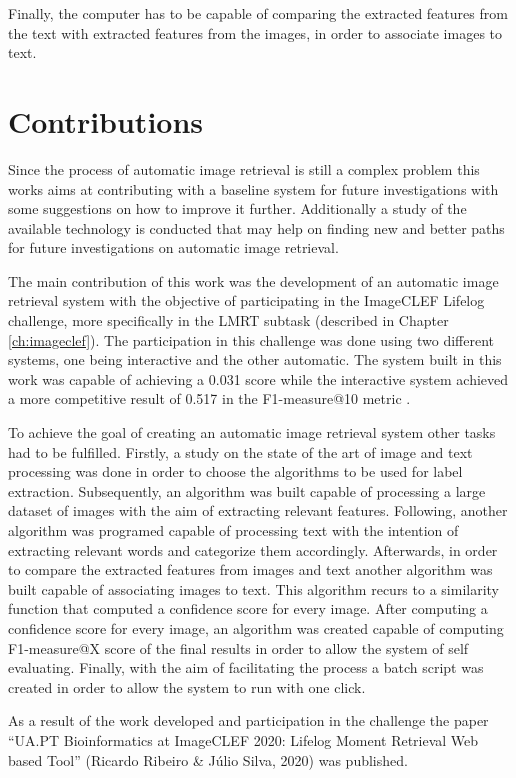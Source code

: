 Finally, the computer has to be capable of comparing the extracted features from the text with extracted features from the images, in order to associate images to text.

\section{Contributions}

Since the process of automatic image retrieval is still a complex problem this works aims at contributing with a baseline system for future investigations with some suggestions on how to improve it further. Additionally a study of the available technology is conducted that may help on finding new and better paths for future investigations on automatic image retrieval.

The main contribution of this work was the development of an automatic image retrieval system with the objective of participating in the ImageCLEF Lifelog challenge, more specifically in the LMRT subtask (described in Chapter \ref{ch:imageclef}). The participation in this challenge was done using two different systems, one being interactive and the other automatic. The system built in this work was capable of achieving a 0.031 score while the interactive system achieved a more competitive result of 0.517 in the F1-measure@10 metric \cite{Ribeiro2020}.


To achieve the goal of creating an automatic image retrieval system other tasks had to be fulfilled. Firstly, a study on the state of the art of image and text processing was done in order to choose the algorithms to be used for label extraction. Subsequently, an algorithm was built capable of processing a large dataset of images  with the aim of extracting relevant features. Following, another algorithm was programed capable of processing text with the intention of extracting relevant words and categorize them accordingly. Afterwards, in order to compare the extracted features from images and text another algorithm was built capable of associating images to text. This algorithm recurs to a similarity function that computed a confidence score for every image. After computing a confidence score for every image, an algorithm was created capable of computing F1-measure@X score of the final results in order to allow the system of self evaluating. Finally, with the aim of facilitating the process a batch script was created in order to allow the system to run with one click.

As a result of the work developed and participation in the challenge the paper ``UA.PT Bioinformatics at ImageCLEF 2020: Lifelog Moment Retrieval Web based Tool” (Ricardo Ribeiro \& Júlio Silva, 2020) was published.
